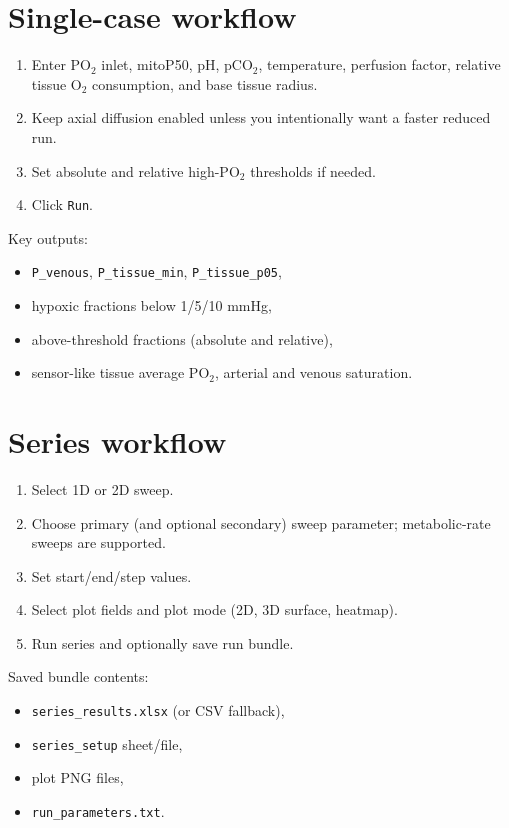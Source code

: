 \documentclass[12pt,a4paper]{article}
\begin{document}
\section{Single-case workflow}
\begin{enumerate}
    \item Enter PO$_2$ inlet, mitoP50, pH, pCO$_2$, temperature, perfusion factor, relative tissue O$_2$ consumption, and base tissue radius.
    \item Keep axial diffusion enabled unless you intentionally want a faster reduced run.
    \item Set absolute and relative high-PO$_2$ thresholds if needed.
    \item Click \texttt{Run}.
\end{enumerate}

Key outputs:
\begin{itemize}
    \item \texttt{P\_venous}, \texttt{P\_tissue\_min}, \texttt{P\_tissue\_p05},
    \item hypoxic fractions below 1/5/10 mmHg,
    \item above-threshold fractions (absolute and relative),
    \item sensor-like tissue average PO$_2$, arterial and venous saturation.
\end{itemize}

\section{Series workflow}
\begin{enumerate}
    \item Select 1D or 2D sweep.
    \item Choose primary (and optional secondary) sweep parameter; metabolic-rate sweeps are supported.
    \item Set start/end/step values.
    \item Select plot fields and plot mode (2D, 3D surface, heatmap).
    \item Run series and optionally save run bundle.
\end{enumerate}

Saved bundle contents:
\begin{itemize}
    \item \texttt{series\_results.xlsx} (or CSV fallback),
    \item \texttt{series\_setup} sheet/file,
    \item plot PNG files,
    \item \texttt{run\_parameters.txt}.
\end{itemize}
\end{document}
